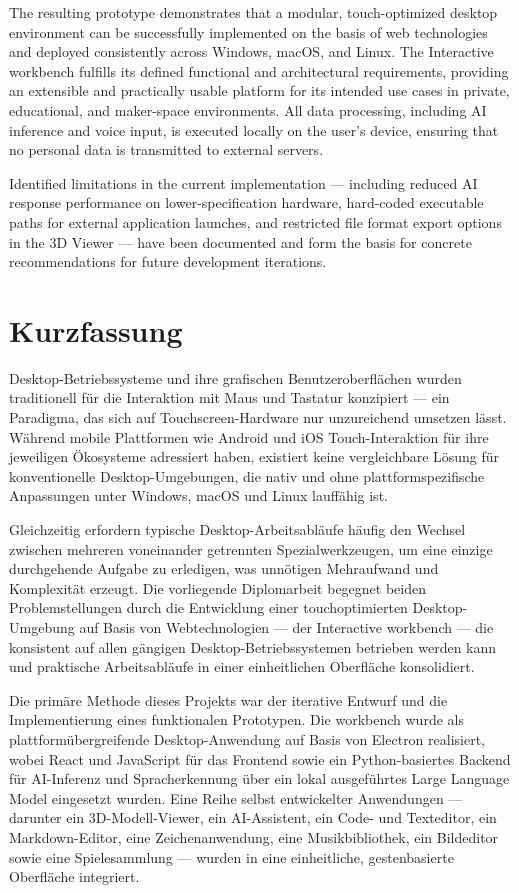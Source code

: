 \documentclass[a4paper,12pt]{article}
\begin{document}
The resulting prototype demonstrates that a modular, touch-optimized desktop environment can be successfully implemented on the basis of web technologies and deployed consistently across Windows, macOS, and Linux. The Interactive workbench fulfills its defined functional and architectural requirements, providing an extensible and practically usable platform for its intended use cases in private, educational, and maker-space environments. All data processing, including AI inference and voice input, is executed locally on the user's device, ensuring that no personal data is transmitted to external servers.

Identified limitations in the current implementation — including reduced AI response performance on lower-specification hardware, hard-coded executable paths for external application launches, and restricted file format export options in the 3D Viewer — have been documented and form the basis for concrete recommendations for future development iterations.

\newpage
\section{Kurzfassung}
Desktop-Betriebssysteme und ihre grafischen Benutzeroberflächen wurden traditionell für die Interaktion mit Maus und Tastatur konzipiert — ein Paradigma, das sich auf Touchscreen-Hardware nur unzureichend umsetzen lässt. Während mobile Plattformen wie Android und iOS Touch-Interaktion für ihre jeweiligen Ökosysteme adressiert haben, existiert keine vergleichbare Lösung für konventionelle Desktop-Umgebungen, die nativ und ohne plattformspezifische Anpassungen unter Windows, macOS und Linux lauffähig ist. 

Gleichzeitig erfordern typische Desktop-Arbeitsabläufe häufig den Wechsel zwischen \newline mehreren voneinander getrennten Spezialwerkzeugen, um eine einzige durchgehende Aufgabe zu erledigen, was unnötigen Mehraufwand und Komplexität erzeugt. Die vorliegende Diplomarbeit begegnet beiden Problemstellungen durch die Entwicklung einer touchoptimierten Desktop-Umgebung auf Basis von Webtechnologien — der Interactive workbench — die konsistent auf allen gängigen Desktop-Betriebssystemen betrieben werden kann und praktische Arbeitsabläufe in einer einheitlichen Oberfläche konsolidiert.

Die primäre Methode dieses Projekts war der iterative Entwurf und die Implementierung eines funktionalen Prototypen. Die workbench wurde als plattformübergreifende Desktop-Anwendung auf Basis von Electron realisiert, wobei React und JavaScript für das Frontend sowie ein Python-basiertes Backend für AI-Inferenz und Spracherkennung über ein lokal ausgeführtes Large Language Model eingesetzt wurden. Eine Reihe selbst entwickelter Anwendungen — darunter ein 3D-Modell-Viewer, ein AI-Assistent, ein Code- und Texteditor, ein Markdown-Editor, eine Zeichenanwendung, eine Musikbibliothek, ein Bildeditor sowie eine Spielesammlung — wurden in eine einheitliche, gestenbasierte Oberfläche integriert. 
\end{document}
